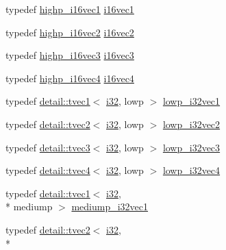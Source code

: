 \begin{DoxyCompactItemize}
\item 
typedef \hyperlink{group__gtc__type__precision_ga0ed3103e2d3acb4efbe313add4243a72}{highp\-\_\-i16vec1} \hyperlink{group__gtc__type__precision_gaa3a2fe05ca6a7086c5580922ebda4bf3}{i16vec1}
\item 
typedef \hyperlink{group__gtc__type__precision_ga74df9e215c049f82d277473c4c974bb4}{highp\-\_\-i16vec2} \hyperlink{group__gtc__type__precision_ga13f7a88281faec6a72231dce73ce6129}{i16vec2}
\item 
typedef \hyperlink{group__gtc__type__precision_ga8dcfd412bd9ce99a1cf5c2b6e50f07e7}{highp\-\_\-i16vec3} \hyperlink{group__gtc__type__precision_ga22ec113d49837ef823048bb01511564c}{i16vec3}
\item 
typedef \hyperlink{group__gtc__type__precision_ga7fd6f1b3c224833cc330a2c64b6994dd}{highp\-\_\-i16vec4} \hyperlink{group__gtc__type__precision_ga28cd96ac55e2209bdbd3a41cb8af970a}{i16vec4}
\item 
typedef \hyperlink{structglm_1_1detail_1_1tvec1}{detail\-::tvec1}$<$ \hyperlink{group__gtc__type__precision_ga1d8ed5c43e91ea7d4528389da4fa9524}{i32}, lowp $>$ \hyperlink{group__gtc__type__precision_gadb82f1c8a0f4d3304862d32079961974}{lowp\-\_\-i32vec1}
\item 
typedef \hyperlink{structglm_1_1detail_1_1tvec2}{detail\-::tvec2}$<$ \hyperlink{group__gtc__type__precision_ga1d8ed5c43e91ea7d4528389da4fa9524}{i32}, lowp $>$ \hyperlink{group__gtc__type__precision_ga1ac855a9b4ef24908d00ab715e7ddbff}{lowp\-\_\-i32vec2}
\item 
typedef \hyperlink{structglm_1_1detail_1_1tvec3}{detail\-::tvec3}$<$ \hyperlink{group__gtc__type__precision_ga1d8ed5c43e91ea7d4528389da4fa9524}{i32}, lowp $>$ \hyperlink{group__gtc__type__precision_gaa4a0dd64d4253a3641225254670c7b95}{lowp\-\_\-i32vec3}
\item 
typedef \hyperlink{structglm_1_1detail_1_1tvec4}{detail\-::tvec4}$<$ \hyperlink{group__gtc__type__precision_ga1d8ed5c43e91ea7d4528389da4fa9524}{i32}, lowp $>$ \hyperlink{group__gtc__type__precision_ga99adefeda08a56345b0553d13283d2fa}{lowp\-\_\-i32vec4}
\item 
typedef \hyperlink{structglm_1_1detail_1_1tvec1}{detail\-::tvec1}$<$ \hyperlink{group__gtc__type__precision_ga1d8ed5c43e91ea7d4528389da4fa9524}{i32}, \\*
mediump $>$ \hyperlink{group__gtc__type__precision_ga44c6a3b78e635d91e35e1c41ab6b0ba1}{mediump\-\_\-i32vec1}
\item 
typedef \hyperlink{structglm_1_1detail_1_1tvec2}{detail\-::tvec2}$<$ \hyperlink{group__gtc__type__precision_ga1d8ed5c43e91ea7d4528389da4fa9524}{i32}, \\*

\end{DoxyCompactItemize}
